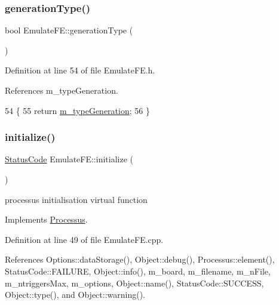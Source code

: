 \subsubsection{\texorpdfstring{generation\+Type()}{generationType()}}
{\footnotesize\ttfamily bool Emulate\+F\+E\+::generation\+Type (\begin{DoxyParamCaption}{ }\end{DoxyParamCaption})\hspace{0.3cm}{\ttfamily [inline]}}



Definition at line 54 of file Emulate\+F\+E.\+h.



References m\+\_\+type\+Generation.


\begin{DoxyCode}
54                        \{
55     \textcolor{keywordflow}{return} \hyperlink{classEmulateFE_aa8bd0aa42cc5f3d52930408807b3067c}{m\_typeGeneration};
56   \}
\end{DoxyCode}
\mbox{\label{classEmulateFE_aeb689a366ed5e675d02d08ee787d338e}} 
\subsubsection{\texorpdfstring{initialize()}{initialize()}}
{\footnotesize\ttfamily \hyperlink{classStatusCode}{Status\+Code} Emulate\+F\+E\+::initialize (\begin{DoxyParamCaption}{ }\end{DoxyParamCaption})\hspace{0.3cm}{\ttfamily [virtual]}}

processus initialisation virtual function 

Implements \hyperlink{classProcessus_aee88ad7b77ae7319cf8b128e9dd2ea11}{Processus}.



Definition at line 49 of file Emulate\+F\+E.\+cpp.



References Options\+::data\+Storage(), Object\+::debug(), Processus\+::element(), Status\+Code\+::\+F\+A\+I\+L\+U\+RE, Object\+::info(), m\+\_\+board, m\+\_\+filename, m\+\_\+n\+File, m\+\_\+ntriggers\+Max, m\+\_\+options, Object\+::name(), Status\+Code\+::\+S\+U\+C\+C\+E\+SS, Object\+::type(), and Object\+::warning().


